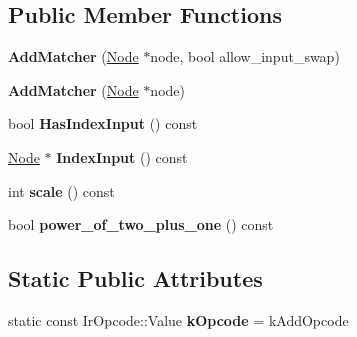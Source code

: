 \subsection*{Public Member Functions}
\begin{DoxyCompactItemize}
\item 
{\bfseries Add\+Matcher} (\hyperlink{classv8_1_1internal_1_1compiler_1_1_node}{Node} $\ast$node, bool allow\+\_\+input\+\_\+swap)\hypertarget{structv8_1_1internal_1_1compiler_1_1_add_matcher_a67423087c3f808f0bce7bb59c6bb68a4}{}\label{structv8_1_1internal_1_1compiler_1_1_add_matcher_a67423087c3f808f0bce7bb59c6bb68a4}

\item 
{\bfseries Add\+Matcher} (\hyperlink{classv8_1_1internal_1_1compiler_1_1_node}{Node} $\ast$node)\hypertarget{structv8_1_1internal_1_1compiler_1_1_add_matcher_a5cbb85d2914277d4e29e4a9cc2f2a193}{}\label{structv8_1_1internal_1_1compiler_1_1_add_matcher_a5cbb85d2914277d4e29e4a9cc2f2a193}

\item 
bool {\bfseries Has\+Index\+Input} () const \hypertarget{structv8_1_1internal_1_1compiler_1_1_add_matcher_a53c90b9d097adbb89f01db8f06d5ab0e}{}\label{structv8_1_1internal_1_1compiler_1_1_add_matcher_a53c90b9d097adbb89f01db8f06d5ab0e}

\item 
\hyperlink{classv8_1_1internal_1_1compiler_1_1_node}{Node} $\ast$ {\bfseries Index\+Input} () const \hypertarget{structv8_1_1internal_1_1compiler_1_1_add_matcher_aaccdd17cae0efdc79ed510de81530c78}{}\label{structv8_1_1internal_1_1compiler_1_1_add_matcher_aaccdd17cae0efdc79ed510de81530c78}

\item 
int {\bfseries scale} () const \hypertarget{structv8_1_1internal_1_1compiler_1_1_add_matcher_ab3ab612b97b5ee712db9f267c8f24c81}{}\label{structv8_1_1internal_1_1compiler_1_1_add_matcher_ab3ab612b97b5ee712db9f267c8f24c81}

\item 
bool {\bfseries power\+\_\+of\+\_\+two\+\_\+plus\+\_\+one} () const \hypertarget{structv8_1_1internal_1_1compiler_1_1_add_matcher_a1b80d27debc000b2ccae8b180a22c7f7}{}\label{structv8_1_1internal_1_1compiler_1_1_add_matcher_a1b80d27debc000b2ccae8b180a22c7f7}

\end{DoxyCompactItemize}
\subsection*{Static Public Attributes}
\begin{DoxyCompactItemize}
\item 
static const Ir\+Opcode\+::\+Value {\bfseries k\+Opcode} = k\+Add\+Opcode\hypertarget{structv8_1_1internal_1_1compiler_1_1_add_matcher_a9f233656772a07527c3462fddbc0c2f6}{}\label{structv8_1_1internal_1_1compiler_1_1_add_matcher_a9f233656772a07527c3462fddbc0c2f6}

\end{DoxyCompactItemize}

